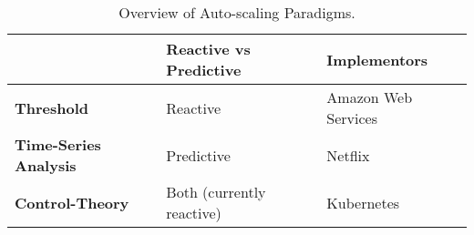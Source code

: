 \begin{table}[]
\centering
\caption{Overview of Auto-scaling Paradigms.}
\begin{tabular}{|l|l|l|}
\hline
                    & \textbf{Reactive vs Predictive} & \textbf{Implementors} \\ \hline
\textbf{Threshold}  & Reactive                        & Amazon Web Services   \\ \hline
\textbf{Time-Series Analysis} & Predictive            & Netflix               \\ \hline
\textbf{Control-Theory} & Both (currently reactive)   & Kubernetes            \\ \hline
\end{tabular}
\end{table}

